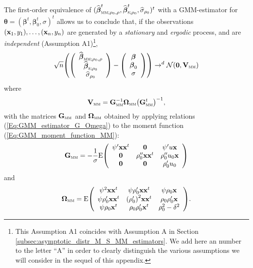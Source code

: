 The first-order equivalence of $(\sthat{\boldsymbol\beta}_{\stsc{MM}%
;\rho_{0},\rho}^{t},\sthat{\boldsymbol\beta}_{\stsc{S};\rho_{0}}%
^{t},\sthat{\sigma}_{\rho_{0}})^{t}$ with a GMM-estimator for
$\boldsymbol{\theta}=(\boldsymbol\beta^{t},\boldsymbol\beta_{0}^{t}%
,\sigma)^{t}$ allows us to conclude that, if the observations $\left(
\stvec{x}_{1},y_{1}\right)  ,\ldots,\left(  \stvec{x}_{n},y_{n}\right)  $
are generated by a \emph{stationary} and \emph{ergodic} process, and are
\emph{independent} (Assumption A1)\footnote{This Assumption A1 coincides
with Assumption A in Section \ref{subsec:asymptotic_distr_M_S_MM_estimators}.
We add here an number to the letter “A” in order to clearly distinguish the
various assumptions we will consider in the sequel of this appendix.},
\[
\sqrt{n}\left(  \left(
\begin{array}
[c]{c}%
\sthat{\boldsymbol\beta}_{\stsc{MM};\rho_{0},\rho}\\
\sthat{\boldsymbol\beta}_{\stsc{S};\rho_{0}}\\
\sthat{\sigma}_{\rho_{0}}%
\end{array}
\right)  -\left(
\begin{array}
[c]{c}%
\boldsymbol\beta\\
\boldsymbol\beta_{0}\\
\sigma
\end{array}
\right)  \right)  \rightarrow^{d}\mathcal{N}(\mathbf{0},\mathbf{V}%
_{\stsc{MM}})
\]
where
\[
\mathbf{V}_{\stsc{MM}}=\mathbf{G}_{\stsc{MM}}^{-1}\boldsymbol{\Omega
}_{\stsc{MM}}\left(  \mathbf{G}_{\stsc{MM}}^{t}\right)  ^{-1},
\]
with the matrices $\mathbf{G}_{\stsc{MM}}$ and $\boldsymbol{\Omega
}_{\stsc{MM}}$ obtained by applying relations
(\ref{Eq:GMM_estimator_G_Omega}) to the moment function
(\ref{Eq:GMM_moment_function_MM}):
\[
\mathbf{G}_{\stsc{MM}}=-\frac{1}{\sigma}\mathrm{E}\left(
\begin{array}
[c]{ccc}%
\psi^{\prime}\mathbf{xx}^{t} & \mathbf{0} & \psi^{\prime}u\stvec{x}\\
\mathbf{0} & \rho_{0}^{\prime\prime}\mathbf{xx}^{t} & \rho_{0}^{\prime\prime
}u_{0}\stvec{x}\\
\mathbf{0} & \mathbf{0} & \rho_{0}^{\prime}u_{0}%
\end{array}
\right)
\]
and
\[
\boldsymbol{\Omega}_{\stsc{MM}}=\mathrm{E}\left(
\begin{array}
[c]{ccc}%
\psi^{2}\mathbf{xx}^{t} & \psi\rho_{0}^{\prime}\mathbf{xx}^{t} & \psi\rho
_{0}\stvec{x}\\
\psi\rho_{0}^{\prime}\mathbf{xx}^{t} & \left(  \rho_{0}^{\prime}\right)
^{2}\mathbf{xx}^{t} & \rho_{0}\rho_{0}^{\prime}\stvec{x}\\
\psi\rho_{0}\stvec{x}^{t} & \rho_{0}\rho_{0}^{\prime}\stvec{x}^{t} &
\rho_{0}^{2}-\delta^{2}%
\end{array}
\right)  .
\]
